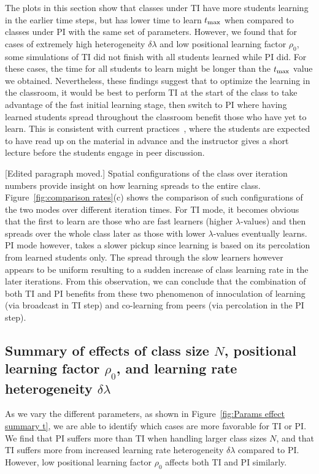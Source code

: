 \documentclass[twocolumn,secnumarabic,amssymb, nobibnotes, aps, prd]{revtex4-2}
\begin{document}
    The plots in this section show that classes under TI have more students learning in the earlier time steps, but has lower time to learn $t_{\rm max}$ when compared to classes under PI with the same set of parameters.
    However, we found that for cases of extremely high heterogeneity $\delta\lambda$ and low positional learning factor $\rho_0$, some simulations of TI did not finish with all students learned while PI did.
    For these cases, the time for all students to learn might be longer than the $t_{\rm max}$ value we obtained.
    Nevertheless, these findings suggest that to optimize the learning in the classroom, it would be best to perform TI at the start of the class to take advantage of the fast initial learning stage, then switch to PI where having learned students spread throughout the classroom benefit those who have yet to learn.
    This is consistent with current practices~\cite{mazur1997peer,smith2009peer,lasry2008peer,roxas2010seating}, where the students are expected to have read up on the material in advance and the instructor gives a short lecture before the students engage in peer discussion.


    {\color{red} [Edited paragraph moved.]}
    Spatial configurations of the class over iteration numbers provide insight on how learning spreads to the entire class.
    Figure~\ref{fig:comparison rates}(c) shows the comparison of such configurations of the two modes over different iteration times.
    For TI mode, it becomes obvious that the first to learn are those who are fast learners (higher $\lambda$-values) and then spreads over the whole class later as those with lower $\lambda$-values eventually learns.
    PI mode however, takes a slower pickup since learning is based on its percolation from learned students only.
    The spread through the slow learners however appears to be uniform resulting to a sudden increase of class learning rate in the later iterations.
    From this observation, we can conclude that the combination of both TI and PI benefits from these two phenomenon of innoculation of learning (via broadcast in TI step) and co-learning from peers (via percolation in the PI step).
    

    \subsection{Summary of effects of class size $N$, positional learning factor $\rho_0$, and learning rate heterogeneity $\delta\lambda$}
        
        As we vary the different parameters, as shown in Figure~\ref{fig:Params effect summary t}, we are able to identify which cases are more favorable for TI or PI.
        We find that PI suffers more than TI when handling larger class sizes $N$, and that TI suffers more from increased learning rate heterogeneity $\delta\lambda$ compared to PI.
        However, low positional learning factor $\rho_0$ affects both TI and PI similarly.
\end{document}
